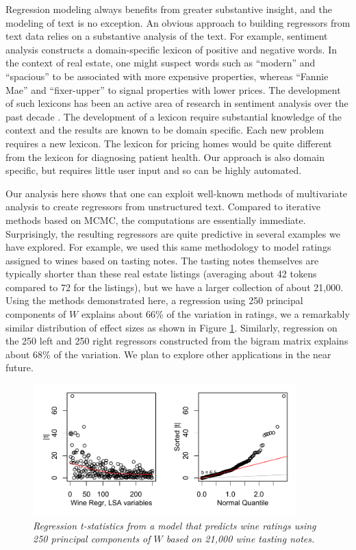 \documentclass[12pt]{article}
\begin{document}
  Regression modeling always benefits from greater substantive insight, and the modeling of text is no exception.  An obvious approach to building regressors from text data relies on a
 substantive analysis of the text.  For example, sentiment analysis constructs a
 domain-specific lexicon of positive and negative words.  In the context of real
 estate, one might suspect  words such as ``modern'' and ``spacious''  to be associated with more expensive properties, whereas
 ``Fannie Mae'' and ``fixer-upper'' to signal properties with lower prices.  The
 development of such lexicons has been an active area of research in sentiment
 analysis over the past decade \citep{taboada11}.  The development of a lexicon
 require substantial knowledge of the context and the results are known to be
 domain specific.  Each new problem requires a new lexicon.  The lexicon for
 pricing homes would be quite different from the lexicon for diagnosing patient
 health.  Our approach is also domain specific, but requires little user input
 and so can be highly automated.


 Our analysis here shows that one can exploit well-known methods of multivariate analysis to create regressors from unstructured text.  Compared to iterative methods based on MCMC, the computations are essentially immediate.  Surprisingly, the resulting regressors are quite predictive in several examples we have explored.  For example, we used this same methodology to model ratings assigned to wines based on tasting notes.  The tasting notes themselves are typically shorter than these real estate listings (averaging about 42 tokens compared to 72 for the listings), but we have a larger collection of about 21,000.  Using the methods demonstrated here, a regression using 250 principal components of $W$ explains about 66\% of the variation in ratings, we a remarkably similar distribution of effect sizes as shown in Figure \ref{fig:wine}.  Similarly, regression on the 250 left and 250 right regressors constructed from the bigram matrix explains about 68\% of the variation.  We plan to explore other applications in the near future.
 
 
 \begin{figure}
 \caption{ \label{fig:wine} \sl Regression t-statistics from a model that predicts wine ratings using 250 principal components of $W$ based on 21,000 wine tasting notes.}
 
 \centerline{
   \includegraphics[width=4in]{figures/wine.pdf}
   }
  \end{figure} 
  
\end{document}
